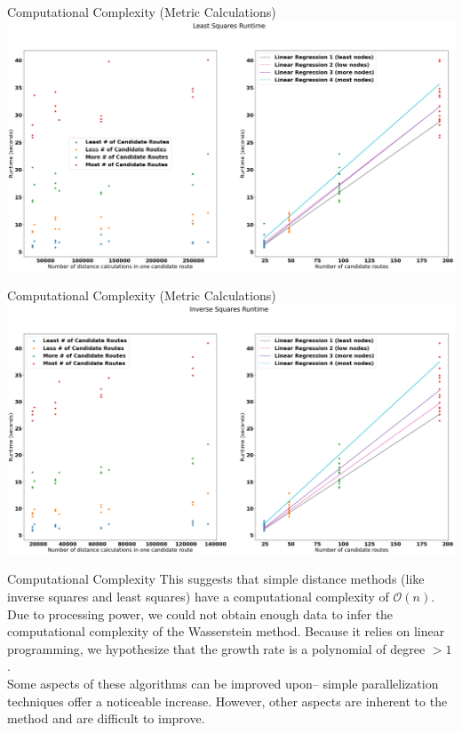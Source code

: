 \documentclass[aspectratio=169, bigfiles, professionalfonts, hyperref={colorlinks=true, allcolors=., urlcolor=blue}]{beamer}
\begin{document}
\begin{frame}{Computational Complexity (Metric Calculations)}
    \centering
    \includegraphics[scale=0.18]{Jupyter Notebook LaTeX/complexity1.png}
\end{frame}

\begin{frame}{Computational Complexity (Metric Calculations)}
    \centering
    \includegraphics[scale=0.18]{Jupyter Notebook LaTeX/complexity2.png}

\end{frame}

\begin{frame}{Computational Complexity}
    This suggests that simple distance methods (like inverse squares and least squares) have a computational complexity of $\mathcal{O}(n)$. Due to processing power, we could not obtain enough data to infer the computational complexity of the Wasserstein method. Because it relies on linear programming, we hypothesize that the growth rate is a polynomial of degree $>1$.\\
\vspace{5mm}
    Some aspects of these algorithms can be improved upon-- simple parallelization techniques offer a noticeable increase. However, other aspects are inherent to the method and are difficult to improve.
\end{frame}
\end{document}

